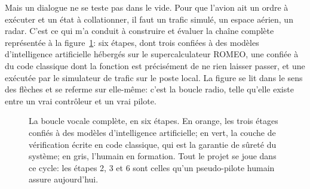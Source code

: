 \documentclass[11pt,a4paper]{article}
\begin{document}
Mais un dialogue ne se teste pas dans le vide. Pour que l'avion ait un ordre à exécuter et un état à collationner, il faut un trafic simulé, un espace aérien, un radar. C'est ce qui m'a conduit à construire et évaluer la chaîne complète représentée à la figure~\ref{fig:boucle}: six étapes, dont trois confiées à des modèles d'intelligence artificielle hébergés sur le supercalculateur ROMEO, une confiée à du code classique dont la fonction est précisément de ne rien laisser passer, et une exécutée par le simulateur de trafic sur le poste local. La figure se lit dans le sens des flèches et se referme sur elle-même: c'est la boucle radio, telle qu'elle existe entre un vrai contrôleur et un vrai pilote.

\begin{figure}[!htbp]
\centering
{} 
\caption[La boucle vocale complète, en six étapes]{La boucle vocale complète, en six étapes. En orange, les trois étages confiés à des
modèles d'intelligence artificielle; en vert, la couche de vérification écrite en code
classique, qui est la garantie de sûreté du système; en gris, l'humain en formation. Tout le
projet se joue dans ce cycle: les étapes 2, 3 et 6 sont celles qu'un pseudo-pilote humain
assure aujourd'hui.}
\label{fig:boucle}
\end{figure}
\end{document}
